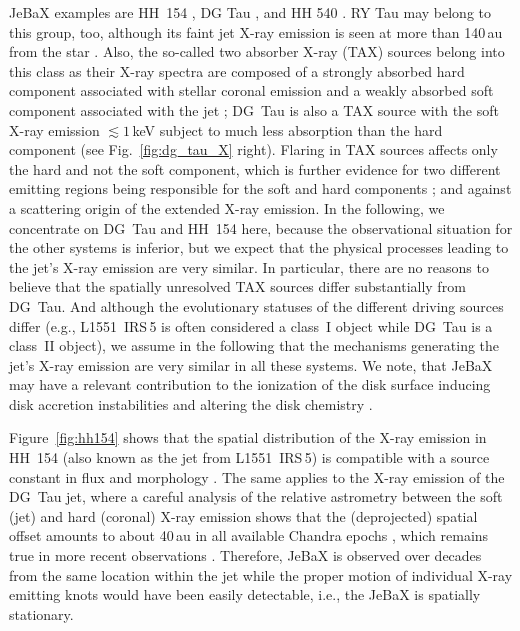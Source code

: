 JeBaX examples are
HH~154 \citep{Favata_2002,Favata_2006,Schneider_2011,Bonito_2011}, DG Tau \citep[see Fig.~\ref{fig:dg_tau_X};][]{Guedel_2005,Guedel_2008,Schneider_2008}, and HH 540 \citep{Kastner_2005}. RY Tau  may belong to this group, too,  although its faint jet X-ray emission is seen at more than 140\,au from the star \citep{Skinner_2011}. Also, the so-called two absorber X-ray (TAX) sources belong into this class as their X-ray spectra are composed of a strongly absorbed hard component associated with stellar coronal emission and a weakly absorbed soft component associated with the jet \citep[][]{Guedel_2007}; DG~Tau is also a TAX source with the soft X-ray emission $\lesssim1$\,keV subject to much less absorption than the hard component (see Fig.~\ref{fig:dg_tau_X} right). Flaring in TAX sources affects only the hard and not the soft component, which is further evidence for two different emitting regions being responsible for the soft and hard components \citep{Guedel_2007}; and against a scattering origin of the extended X-ray emission. In the following, we concentrate on DG~Tau and HH~154 here, because 
the observational situation for the other systems is inferior, but we expect that the physical processes leading to the jet's X-ray emission are very similar. In particular, there are no reasons to believe that the spatially unresolved TAX sources differ substantially from DG~Tau.
And although the evolutionary statuses of the different driving sources differ (e.g., L1551~IRS\,5 is often considered a class~I object while DG~Tau is a class~II object), we assume in the following that the mechanisms generating the jet's X-ray emission are very similar in all these systems. We note, that JeBaX may have a relevant contribution to the ionization of the disk surface inducing disk accretion instabilities \cite{Balbus_1991} and altering the disk chemistry \cite{Glassgold_2004}.


Figure~\ref{fig:hh154} shows that the spatial distribution of the X-ray emission in HH~154 (also known as the jet from L1551~IRS\,5) is compatible with a source constant in flux and morphology  \cite{Schneider_2011,Bonito_2011}. The same applies to the  X-ray emission of the DG~Tau jet, where 
a careful analysis of the relative astrometry between the soft (jet) and hard (coronal) X-ray emission shows that the (deprojected) spatial offset amounts to about 40\,au in all available  Chandra  epochs \citep[see Fig.~\ref{fig:dg_tau_X} and ][]{Schneider_2008}, which remains true in more recent observations \citep{Guedel_2011}. Therefore, JeBaX is observed over decades from the same location within the jet while the proper motion of individual X-ray emitting knots would have been easily detectable, i.e., the JeBaX is spatially stationary.

